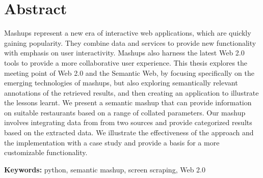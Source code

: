 \chapter{Abstract}

Mashups represent a new era of interactive web applications, which are quickly gaining popularity. They combine data and services to provide new functionality with emphasis on user interactivity. Mashups also harness the latest Web 2.0 tools to provide a more collaborative user experience. This thesis explores the meeting point of Web 2.0 and the Semantic Web, by focusing specifically on the emerging technologies of mashups, but also exploring semantically relevant annotations of the retrieved results, and then creating an application to illustrate the lessons learnt. We present a semantic mashup that can provide information on suitable restaurants based on a range of collated parameters. Our mashup involves integrating data from from two sources and provide categorized results based on the extracted data. We illustrate the effectiveness of the approach and the implementation with a case study and provide a basis for a more customizable functionality.

\textbf{Keywords:} python, semantic mashup, screen scraping, Web 2.0
